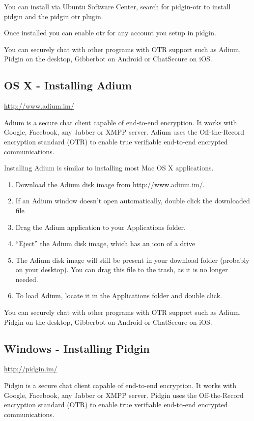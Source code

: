 You can install via Ubuntu Software Center, search for pidgin-otr to
install pidgin and the pidgin otr plugin.

Once installed you can enable otr for any account you setup in pidgin.

You can securely chat with other programs with OTR support such as
Adium, Pidgin on the desktop, Gibberbot on Android or ChatSecure on iOS.

\subsection{OS X - Installing Adium}

\href{http://www.adium.im/}{http://www.adium.im/}

Adium is a secure chat client capable of end-to-end encryption. It works
with Google, Facebook, any Jabber or XMPP server. Adium uses the
Off-the-Record encryption standard (OTR) to enable true verifiable
end-to-end encrypted communications.

Installing Adium is similar to installing most Mac OS X applications.

\begin{enumerate}[1.]
\item
  Download the Adium disk image from http://www.adium.im/.
\item
  If an Adium window doesn't open automatically, double click the
  downloaded file
\item
  Drag the Adium application to your Applications folder.
\item
  ``Eject'' the Adium disk image, which has an icon of a drive
\item
  The Adium disk image will still be present in your download folder
  (probably on your desktop). You can drag this file to the trash, as it
  is no longer needed.
\item
  To load Adium, locate it in the Applications folder and double click.
\end{enumerate}
You can securely chat with other programs with OTR support such as
Adium, Pidgin on the desktop, Gibberbot on Android or ChatSecure on iOS.

\subsection{Windows - Installing Pidgin}

\href{http://pidgin.im/}{http://pidgin.im/}

Pidgin is a secure chat client capable of end-to-end encryption. It
works with Google, Facebook, any Jabber or XMPP server. Pidgin uses the
Off-the-Record encryption standard (OTR) to enable true verifiable
end-to-end encrypted communications.

